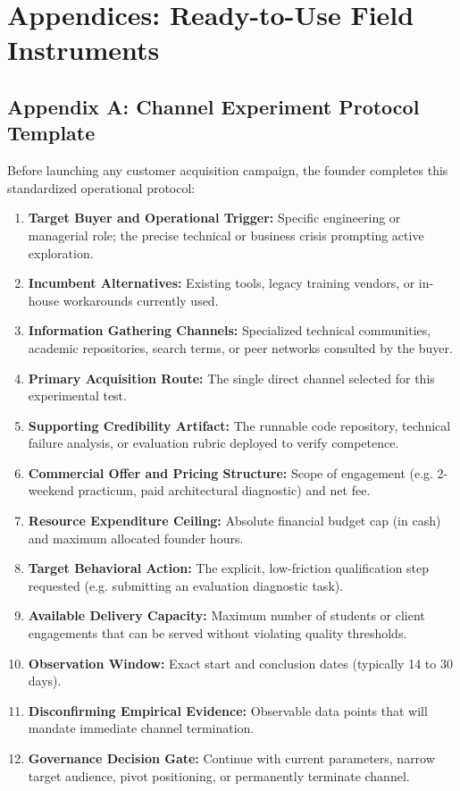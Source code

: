 \section*{Appendices: Ready-to-Use Field Instruments}

\subsection*{Appendix A: Channel Experiment Protocol Template}

Before launching any customer acquisition campaign, the founder completes this standardized operational protocol:
\begin{enumerate}[leftmargin=*,itemsep=1pt]
  \item \textbf{Target Buyer and Operational Trigger:} Specific engineering or managerial role; the precise technical or business crisis prompting active exploration.
  \item \textbf{Incumbent Alternatives:} Existing tools, legacy training vendors, or in-house workarounds currently used.
  \item \textbf{Information Gathering Channels:} Specialized technical communities, academic repositories, search terms, or peer networks consulted by the buyer.
  \item \textbf{Primary Acquisition Route:} The single direct channel selected for this experimental test.
  \item \textbf{Supporting Credibility Artifact:} The runnable code repository, technical failure analysis, or evaluation rubric deployed to verify competence.
  \item \textbf{Commercial Offer and Pricing Structure:} Scope of engagement (e.g. 2-weekend practicum, paid architectural diagnostic) and net fee.
  \item \textbf{Resource Expenditure Ceiling:} Absolute financial budget cap (in cash) and maximum allocated founder hours.
  \item \textbf{Target Behavioral Action:} The explicit, low-friction qualification step requested (e.g. submitting an evaluation diagnostic task).
  \item \textbf{Available Delivery Capacity:} Maximum number of students or client engagements that can be served without violating quality thresholds.
  \item \textbf{Observation Window:} Exact start and conclusion dates (typically 14 to 30 days).
  \item \textbf{Disconfirming Empirical Evidence:} Observable data points that will mandate immediate channel termination.
  \item \textbf{Governance Decision Gate:} Continue with current parameters, narrow target audience, pivot positioning, or permanently terminate channel.
\end{enumerate}

